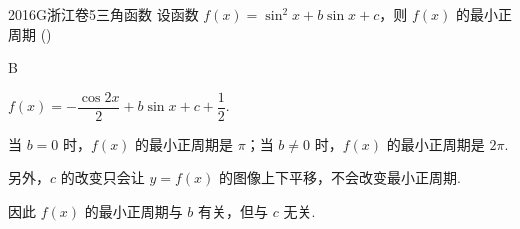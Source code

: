 
\begin{problem}{2016}{G}{浙江卷}{5}{三角函数}
设函数 $ f(x)=\sin^2x+b\sin x+c $，则 $ f(x) $ 的最小正周期 (\hspace{1cm})
\begin{choices}
\end{choices}
\end{problem}

\begin{answer}
B
\end{answer}

\begin{solutions}
$ f(x)=-\dfrac{\cos 2x}{2}+b\sin x+c+\dfrac{1}{2} $.  

当 $ b=0 $ 时，$ f(x) $ 的最小正周期是 $ \pi $；当 $ b\neq 0 $ 时，$ f(x) $ 的最小正周期是 $ 2\pi $.  

另外，$ c $ 的改变只会让 $ y=f(x) $ 的图像上下平移，不会改变最小正周期.  

因此 $ f(x) $ 的最小正周期与 $ b $ 有关，但与 $ c $ 无关.
\end{solutions}